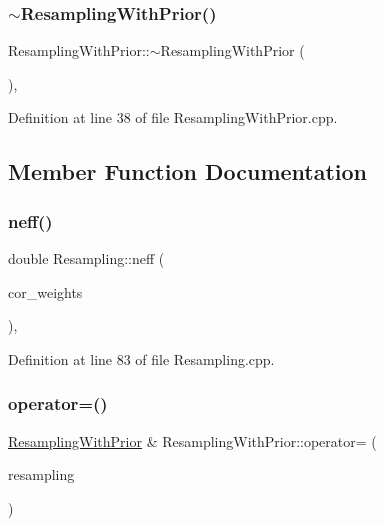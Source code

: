 \subsubsection{\texorpdfstring{$\sim$\+Resampling\+With\+Prior()}{~ResamplingWithPrior()}}
{\footnotesize\ttfamily Resampling\+With\+Prior\+::$\sim$\+Resampling\+With\+Prior (\begin{DoxyParamCaption}{ }\end{DoxyParamCaption})\hspace{0.3cm}{\ttfamily [virtual]}, {\ttfamily [noexcept]}}



Definition at line 38 of file Resampling\+With\+Prior.\+cpp.



\subsection{Member Function Documentation}
\mbox{\label{classbfl_1_1Resampling_af1fbc21ffc2fb10f14b79210de57d614}} 
\subsubsection{\texorpdfstring{neff()}{neff()}}
{\footnotesize\ttfamily double Resampling\+::neff (\begin{DoxyParamCaption}\item[{const Eigen\+::\+Ref$<$ const Eigen\+::\+Vector\+Xd $>$ \&}]{cor\+\_\+weights }\end{DoxyParamCaption})\hspace{0.3cm}{\ttfamily [virtual]}, {\ttfamily [inherited]}}



Definition at line 83 of file Resampling.\+cpp.

\mbox{\label{classbfl_1_1ResamplingWithPrior_a79ed56028dc2f97f0fb400a481998010}} 
\subsubsection{\texorpdfstring{operator=()}{operator=()}}
{\footnotesize\ttfamily \mbox{\hyperlink{classbfl_1_1ResamplingWithPrior}{Resampling\+With\+Prior}} \& Resampling\+With\+Prior\+::operator= (\begin{DoxyParamCaption}\item[{\mbox{\hyperlink{classbfl_1_1ResamplingWithPrior}{Resampling\+With\+Prior}} \&\&}]{resampling }\end{DoxyParamCaption})\hspace{0.3cm}{\ttfamily [noexcept]}}



